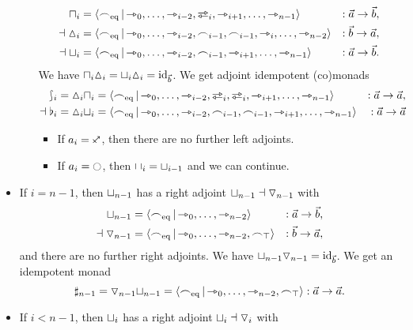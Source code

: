 \documentclass[a4paper]{memoir}
\begin{document}
\begin{example}
\begin{itemize}
\begin{itemize}
			\begin{align*}
				\cohpi_i &= \reshlist{\eqtysym}{\jetsym_0, \ldots, \jetsym_{i-2}, \infrajetsym_i, \jetsym_{i+1}, \ldots, \jetsym_{n-1}}
				&: \vec a \to \vec b, \\
				\dashv
				\cohdisc_i &= \reshlist{\eqtysym}{\jetsym_0, \ldots, \jetsym_{i-2}, \edgesym_{i-1}, \edgesym_{i-1}, \jetsym_i, \ldots, \jetsym_{n-2}}
				&: \vec b \to \vec a, \\
				\dashv
				\cohfget_i &= \reshlist{\eqtysym}{\jetsym_0, \ldots, \jetsym_{i-2}, \edgesym_{i-1}, \jetsym_{i+1}, \ldots, \jetsym_{n-1}}
				&: \vec a \to \vec b.
			\end{align*}
			We have ${\sqcap}_i {\vartriangle}_i = {\sqcup}_i {\vartriangle}_i = \mathrm{id}_{\vec b}$. We get adjoint idempotent (co)monads
			\begin{align*}
				\shp_i = \cohdisc_i \cohpi_i &= \reshlist{\eqtysym}{\jetsym_0, \ldots, \jetsym_{i-2}, \infrajetsym_i, \infrajetsym_i, \jetsym_{i+1}, \ldots, \jetsym_{n-1}} &: \vec a \to \vec a, \\
				\dashv
				\flat_i = \cohdisc_i \cohfget_i &= \reshlist{\eqtysym}{\jetsym_0, \ldots, \jetsym_{i-2}, \edgesym_{i-1}, \edgesym_{i-1}, \jetsym_{i+1}, \ldots, \jetsym_{n-1}} &: \vec a \to \vec a
			\end{align*}
			\begin{itemize}
				\item If $a_i = \ypolar$, then there are no further left adjoints.
				\item If $a_i = \npolar$, then ${\sqcap}_i = {\sqcup}_{i-1}$ and we can continue.
			\end{itemize}
		\end{itemize}
		\item If $i = n-1$, then ${\sqcup}_{n-1}$ has a right adjoint ${\sqcup}_{n-1} \dashv {\triangledown}_{n-1}$ with
		\begin{align*}
			{\sqcup}_{n-1} &= \mathopen{}\left\langle {\frown}_{{\mathrm{eq}}} \,\middle|\, {\rightarrowtriangle}_0, \ldots, {\rightarrowtriangle}_{n-2} \right\rangle\mathclose{} &: \vec a \to \vec b, \\
			\dashv
			{\triangledown}_{n-1} &= \mathopen{}\left\langle {\frown}_{{\mathrm{eq}}} \,\middle|\, {\rightarrowtriangle}_0, \ldots, {\rightarrowtriangle}_{n-2}, {\frown}_\top \right\rangle\mathclose{} &: \vec b \to \vec a,
		\end{align*}
		and there are no further right adjoints.
		We have ${\sqcup}_{n-1} {\triangledown}_{n-1} = \mathrm{id}_{\vec b}$.
		We get an idempotent monad
		\[
			\sharp_{n-1} = {\triangledown}_{n-1} {\sqcup}_{n-1} = \mathopen{}\left\langle {\frown}_{{\mathrm{eq}}} \,\middle|\, {\rightarrowtriangle}_0, \ldots, {\rightarrowtriangle}_{n-2}, {\frown}_\top \right\rangle\mathclose{} : \vec a \to \vec a.
		\]
		\item If $i < n-1$, then ${\sqcup}_i$ has a right adjoint ${\sqcup}_i \dashv {\triangledown}_i$ with

\end{itemize}
\end{example}
\end{document}
